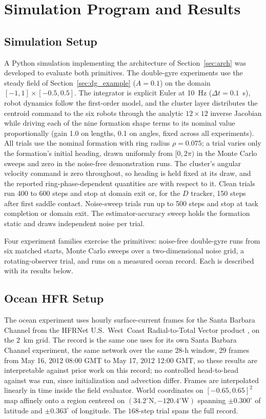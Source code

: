 \documentclass[lettersize,journal]{IEEEtran}
\begin{document}
\section{Simulation Program and Results}

\subsection{Simulation Setup}

A Python simulation implementing the architecture of
Section~\ref{sec:arch} was developed to evaluate both primitives.
The double-gyre experiments use the steady field of
Section~\ref{sec:dg_example} ($A = 0.1$) on the domain $[-1, 1] \times
[-0.5, 0.5]$. The integrator is explicit Euler at 10~Hz ($\Delta t =
0.1$~s), robot dynamics follow the first-order model, and the cluster layer
distributes the
centroid command to the six robots through the analytic $12 \times 12$
inverse Jacobian while driving each of the nine formation shape terms
to its nominal value proportionally (gain 1.0 on lengths, 0.1 on
angles, fixed across all experiments). All trials use the nominal
formation with ring radius $\rho = 0.075$; a trial varies only the
formation's initial heading, drawn uniformly from $[0, 2\pi)$ in the
Monte Carlo sweeps and zero in the noise-free demonstration runs. The
cluster's angular velocity command is zero throughout, so
heading is held fixed at its draw, and the reported
ring-phase-dependent quantities are with respect to it. Clean trials
run 400 to 600 steps and stop at domain exit or, for the $D$ tracker,
150 steps after first saddle contact. Noise-sweep trials run up to 500
steps and stop at task completion or domain exit. The
estimator-accuracy sweep holds the formation static and draws
independent noise per trial.

Four experiment families exercise the primitives: noise-free
double-gyre runs from six matched starts, Monte Carlo sweeps over a
two-dimensional noise grid, a rotating-observer trial, and runs on a
measured ocean record. Each is described with its results below.

\subsection{Ocean HFR Setup}
\label{sec:ocean_sim}

The ocean experiment uses hourly surface-current frames for the Santa
Barbara Channel from the HFRNet U.S.~West~Coast Radial-to-Total Vector
product \cite{35}, on the $2$~km grid. The record is the same one
\cite{26} uses for its own Santa Barbara Channel experiment, the same
network over the same 28-h window, 29 frames from May 16, 2012 08:00
GMT to May 17, 2012 12:00 GMT, so these results are interpretable
against prior work on this record; no controlled head-to-head against
\cite{26} was run, since initialization and advection differ. Frames
are interpolated linearly in time inside the field evaluator. World
coordinates on $[-0.65, 0.65]^2$ map affinely onto a region centered on
$(34.2^{\circ}\mathrm{N}, -120.4^{\circ}\mathrm{W})$ spanning
$\pm 0.300^{\circ}$ of latitude and $\pm 0.363^{\circ}$ of longitude. The
$168$-step trial spans the full record.
\end{document}
